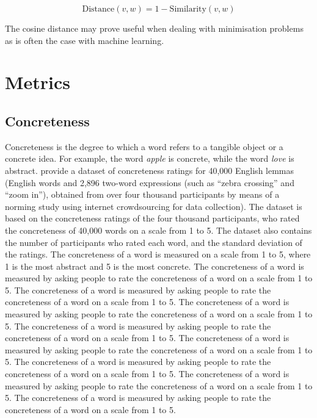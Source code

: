 $$ \text{Distance}(v,w) = 1 - \text{Similarity}(v,w) $$

The cosine distance may prove useful when dealing with minimisation problems as is often the case with machine learning.

\section{Metrics}
\subsection{Concreteness}
\label{concreteness}
Concreteness is the degree to which a word refers to a tangible object or a concrete idea. For example, the word \textit{apple} is concrete, while the word \textit{love} is abstract. \cite{brysbaert2014concreteness} provide a dataset of concreteness ratings for 40,000 English lemmas (English words and 2,896 two-word expressions (such as ``zebra crossing'' and ``zoom in''), obtained from over four thousand participants by means of a norming study using internet crowdsourcing for data collection). The dataset is based on the concreteness ratings of the four thousand participants, who rated the concreteness of 40,000 words on a scale from 1 to 5. The dataset also contains the number of participants who rated each word, and the standard deviation of the ratings. 
 The concreteness of a word is measured on a scale from 1 to 5, where 1 is the most abstract and 5 is the most concrete. The concreteness of a word is measured by asking people to rate the concreteness of a word on a scale from 1 to 5. The concreteness of a word is measured by asking people to rate the concreteness of a word on a scale from 1 to 5. The concreteness of a word is measured by asking people to rate the concreteness of a word on a scale from 1 to 5. The concreteness of a word is measured by asking people to rate the concreteness of a word on a scale from 1 to 5. The concreteness of a word is measured by asking people to rate the concreteness of a word on a scale from 1 to 5. The concreteness of a word is measured by asking people to rate the concreteness of a word on a scale from 1 to 5. The concreteness of a word is measured by asking people to rate the concreteness of a word on a scale from 1 to 5. The concreteness of a word is measured by asking people to rate the concreteness of a word on a scale from 1 to 5.